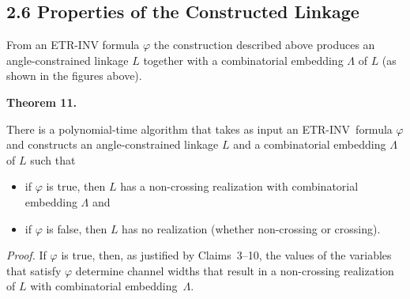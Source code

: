 \documentclass{article}
\begin{document}
\subsection*{2.6 Properties of the Constructed Linkage}

From an \textnormal{\textsc{ETR-INV}} formula $\varphi$ the construction described above produces an angle-constrained linkage $L$ together with a combinatorial embedding $\Lambda$ of $L$ (as shown in the figures above). 

\par\medskip\noindent\textbf{Theorem 11.} \begin{itshape}
There is a polynomial-time algorithm that takes as input an \textnormal{\textsc{ETR-INV}}\ formula $\varphi$ and constructs 
an angle-constrained linkage 
$L$ and a combinatorial embedding $\Lambda$ of $L$ such that 
\begin{itemize}
\item if $\varphi$ is true, then $L$ has a non-crossing realization with combinatorial embedding $\Lambda$ and
\item if $\varphi$ is false, then $L$ has no realization (whether non-crossing or crossing). 
\end{itemize}
\end{itshape}\par\medskip
\par\noindent\textit{Proof.} 
If $\varphi$ is true, then, as justified by Claims~3--10,  the values of the variables that satisfy $\varphi$ determine channel widths that result in a non-crossing realization of $L$ with combinatorial embedding~$\Lambda$.
\end{document}
